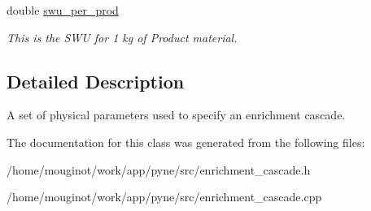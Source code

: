 \begin{DoxyCompactItemize}
\mbox{\label{classpyne_1_1enrichment_1_1_cascade_aaa665cb5f6c5616ce39fe392c428a323}} 
double \hyperlink{classpyne_1_1enrichment_1_1_cascade_aaa665cb5f6c5616ce39fe392c428a323}{swu\+\_\+per\+\_\+prod}
\begin{DoxyCompactList}\small\item\em This is the S\+WU for 1 kg of Product material. \end{DoxyCompactList}\end{DoxyCompactItemize}


\subsection{Detailed Description}
A set of physical parameters used to specify an enrichment cascade. 

The documentation for this class was generated from the following files\+:\begin{DoxyCompactItemize}
\item 
/home/mouginot/work/app/pyne/src/enrichment\+\_\+cascade.\+h\item 
/home/mouginot/work/app/pyne/src/enrichment\+\_\+cascade.\+cpp\end{DoxyCompactItemize}
